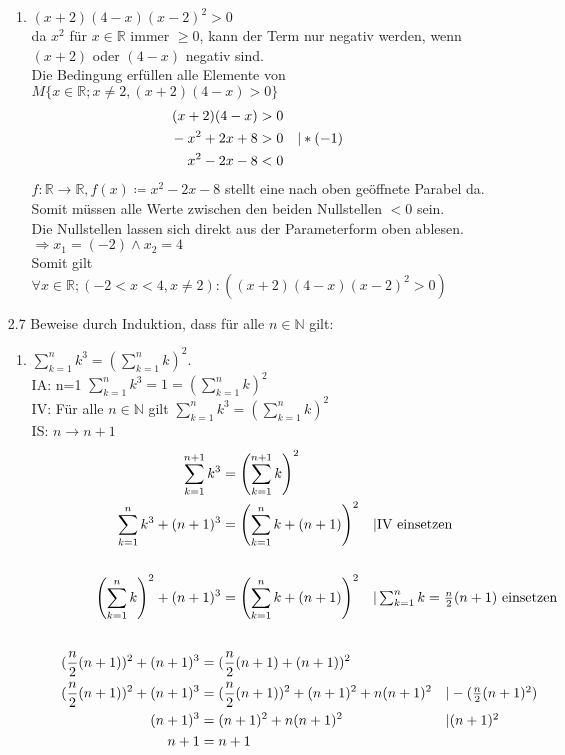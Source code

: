 \documentclass[12pt,letterpaper]{article}
\newcommand{\alignleft}[1]{\tag*{\llap{\makebox[\linewidth][l]{$#1$}}}}
\newcommand{\LLeftrightarrow}{ \alignleft{\Leftrightarrow}}
\newcommand{\eqinfo}[1]{&\makebox[2cm][l]{$\vert #1$}}
\newcommand{\Eqn}[3]{#1 &#2 #3}
\newcommand{\eqnf}[2]{\Eqn{#1}{=}{#2}\\}
\newcommand{\eqn}[2]{\LLeftrightarrow\Eqn{#1}{=}{#2}\\}
\newcommand{\eqni}[3]{\LLeftrightarrow\Eqn{#1}{=}{#2}\eqinfo{#3}\\}
\newcommand{\geqnf}[3]{\Eqn{#1}{#2}{#3}\\}
\newcommand{\geqn}[3]{\LLeftrightarrow\Eqn{#1}{#2}{#3}\\}
\newcommand{\geqni}[4]{\LLeftrightarrow\Eqn{#1}{#2}{#3}\eqinfo{#4}\\}
\begin{document}
\begin{enumerate}
\begin{enumerate}
\item $\left(x+2\right)\left(4-x\right)\left(x-2\right)^2>0$\\
da $x^2$ für $x\in\mathbb{R}$ immer $\geq 0$, kann der Term nur negativ werden, wenn $(x+2)$ oder $(4-x)$ negativ sind.\\
Die Bedingung erfüllen alle Elemente von $M \lbrace x\in\mathbb{R}; x\neq 2, (x+2)(4-x)>0 \rbrace$\\
\begin{align*}
\geqnf{(x+2)(4-x)}{>}{0}
\geqni{-x^2+2x+8}{>}{0}{*(-1)}
\geqn{x^2-2x-8}{<}{0}
\end{align*}
$f: \mathbb{R}\to\mathbb{R}, f(x)\coloneqq x^2-2x-8$ stellt eine nach oben geöffnete Parabel da. Somit müssen alle Werte zwischen den beiden Nullstellen $<0$ sein.\\
Die Nullstellen lassen sich direkt aus der Parameterform oben ablesen.\\
$\Rightarrow x_1=(-2) \land x_2=4$\\
Somit gilt $\forall x\in\mathbb{R};(-2<x<4, x\neq 2):(\left(x+2\right)\left(4-x\right)\left(x-2\right)^2>0)$
\end{enumerate}
\item [2.7] Beweise durch Induktion, dass für alle $n\in\mathbb{N}$ gilt:
\begin{enumerate}
\item $\sum\limits_{k=1}^{n}k^3 = \left(\sum\limits_{k=1}^{n}k\right)^2$.\\
IA: n=1 $\sum\limits_{k=1}^{n}k^3=1=\left(\sum\limits_{k=1}^{n}k\right)^2$\\
IV: Für alle $n\in \mathbb{N}$ gilt $\sum\limits_{k=1}^{n}k^3 = \left(\sum\limits_{k=1}^{n}k\right)^2$\\
IS: $n\to n+1$\\
\begin{align*}
	\eqnf{\sum_{k=1}^{n+1}k^3}{\left(\sum_{k=1}^{n+1}k\right)^2}
	\eqni{\sum_{k=1}^{n}k^3+(n+1)^3}{\left(\sum_{k=1}^{n}k+(n+1)\right)^2}{\text{IV einsetzen}}\\
\eqni{\left(\sum_{k=1}^{n}k\right)^2+(n+1)^3}{\left(\sum_{k=1}^{n}k+(n+1)\right)^2}{\sum_{k=1}^{n}k=\frac{n}{2}(n+1) \text{ einsetzen}}\\
\end{align*}
\begin{align*}
	\eqn{(\frac{n}{2}(n+1))^2+(n+1)^3}{(\frac{n}{2}(n+1)+(n+1))^2}
	\eqni{(\frac{n}{2}(n+1))^2+(n+1)^3}{(\frac{n}{2}(n+1))^2+(n+1)^2+n(n+1)^2}{-(\frac{n}{2}(n+1)^2)}
	\eqni{(n+1)^3}{(n+1)^2+n(n+1)^2}{(n+1)^2}
	\eqn{n+1}{n+1}
\end{align*}


\end{enumerate}
\end{enumerate}
\end{document}
